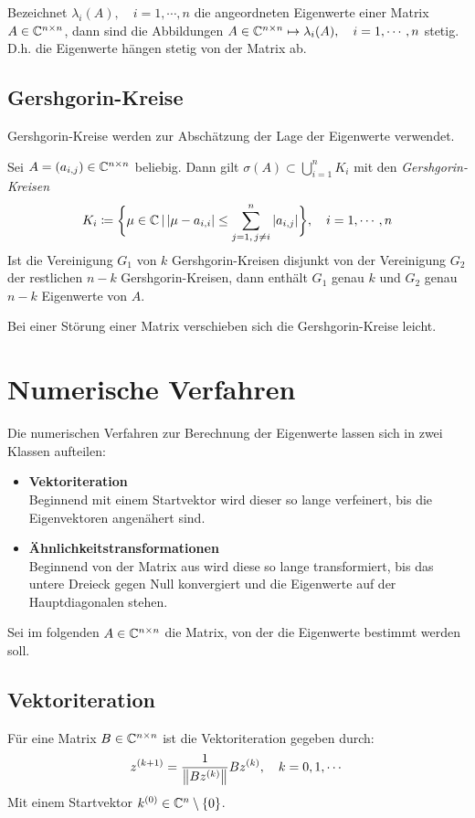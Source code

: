 			Bezeichnet \( \lambda_i(A), \quad i = 1, \cdots, n \) die angeordneten Eigenwerte einer Matrix \( A \in \mathbb{C}^{n \times n} \), dann sind die Abbildungen \( A \in \mathbb{C}^{n \times n} \mapsto \lambda_i(A), \quad i = 1, \cdots, n \) stetig. D.h. die Eigenwerte hängen stetig von der Matrix ab.

			\subsection{Gershgorin-Kreise}
				Gershgorin-Kreise werden zur Abschätzung der Lage der Eigenwerte verwendet.

				Sei \( A = (a_{i,j}) \in \mathbb{C}^{n \times n} \) beliebig. Dann gilt \( \sigma(A) \subset \bigcup_{i=1}^n K_i \) mit den \textit{Gershgorin-Kreisen}
				\begin{equation*}
					K_i \coloneqq \bigg\{ \mu \in \mathbb{C} \,\vert\, \abs{\mu - a_{i,i}} \leq \sum_{j = 1,\, j \neq i}^{n} \abs{a_{i,j}} \bigg\}, \quad i = 1, \cdots, n
				\end{equation*}
				Ist die Vereinigung \(G_1\) von \(k\) Gershgorin-Kreisen disjunkt von der Vereinigung \(G_2\) der restlichen \(n-k\) Gershgorin-Kreisen, dann enthält \(G_1\) genau \(k\) und \(G_2\) genau \(n-k\) Eigenwerte von \(A\).

				Bei einer Störung einer Matrix verschieben sich die Gershgorin-Kreise leicht.

		\section{Numerische Verfahren}
			Die numerischen Verfahren zur Berechnung der Eigenwerte lassen sich in zwei Klassen aufteilen:
			\begin{itemize}
				\item \textbf{Vektoriteration} \\ Beginnend mit einem Startvektor wird dieser so lange verfeinert, bis die Eigenvektoren angenähert sind.
				\item \textbf{Ähnlichkeitstransformationen} \\ Beginnend von der Matrix aus wird diese so lange transformiert, bis das untere Dreieck gegen Null konvergiert und die Eigenwerte auf der Hauptdiagonalen stehen.
			\end{itemize}

			Sei im folgenden \( A \in \mathbb{C}^{ n \times n } \) die Matrix, von der die Eigenwerte bestimmt werden soll.

			\subsection{Vektoriteration}
				Für eine Matrix \( B \in \mathbb{C}^{n \times n} \) ist die Vektoriteration gegeben durch:
				\begin{equation*}
					z^{(k + 1)} = \frac{1}{\norm{Bz^{(k)}}} Bz^{(k)}, \quad k = 0, 1, \cdots
				\end{equation*}
				Mit einem Startvektor \( k^{(0)} \in \mathbb{C}^n \setminus \{0\} \).

